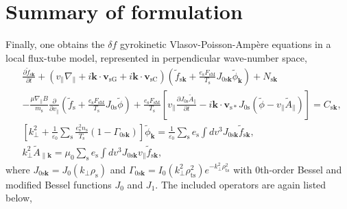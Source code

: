 \section{Summary of formulation}
\label{sec:Summary of formulation}
Finally, one obtains the $\delta f$ gyrokinetic Vlasov-Poisson-Amp\`{e}re equations in a local flux-tube model, represented in perpendicular wave-number space,
\begin{align}
  &\frac{\partial \tilde{f}_{\mathrm{s}\bm{k}}}{\partial t} + \left( v_\parallel \nabla_\parallel + i \bm{k} \cdot \bm{v}_\mathrm{sG} + i \bm{k} \cdot \bm{v}_\mathrm{sC} \right) \left( \tilde{f}_{\mathrm{s}\bm{k}} + \frac{e_\mathrm{s} F_\mathrm{sM}}{T_\mathrm{s}} J_{0\mathrm{s}\bm{k}} \tilde{\phi}_{\bm{k}} \right) + N_{\mathrm{s}\bm{k}} \nonumber \\
  &- \frac{\mu \nabla_\parallel B}{m_\mathrm{s}} \frac{\partial}{\partial v_\parallel} \left( \tilde{f}_\mathrm{s} + \frac{e_\mathrm{s} F_\mathrm{sM}}{T_\mathrm{s}} J_{0\mathrm{s}} \tilde{\phi} \right) + \frac{e_\mathrm{s} F_\mathrm{sM}}{T_\mathrm{s}} \left[ v_\parallel \frac{\partial J_{0\mathrm{s}} \tilde{A}_\parallel}{\partial t} - i \bm{k} \cdot \bm{v}_{\mathrm{s}*} J_{0\mathrm{s}} (\tilde{\phi} - v_\parallel \tilde{A}_\parallel) \right] = C_{\mathrm{s}\bm{k}}, 
  \label{eq:vlasovink}\\
  &\left[ k_\perp^2 + \frac{1}{\varepsilon_0} \sum_\mathrm{s} \frac{e_\mathrm{s}^2 n_\mathrm{s}}{T_\mathrm{s}} \left( 1 - \Gamma_{0\mathrm{s}\bm{k}} \right) \right] \tilde{\phi}_{\bm{k}} = \frac{1}{\varepsilon_0} \sum_\mathrm{s} e_\mathrm{s} \int dv^3 J_{0\mathrm{s}\bm{k}} \tilde{f}_{\mathrm{s}\bm{k}},
  \label{eq:poissonink} \\
  &k_\perp^2 \tilde{A}_{\parallel\bm{k}} = \mu_0 \sum_\mathrm{s} e_\mathrm{s} \int dv^3 J_{0\mathrm{s}\bm{k}} v_\parallel \tilde{f}_{\mathrm{s}\bm{k}},
  \label{eq:ampereink}
\end{align}
where $J_{0\mathrm{s}\bm{k}}=J_0(k_\perp \rho_{\mathrm{s}})$ and $\Gamma_{0\mathrm{s}\bm{k}}=I_0(k_\perp^2 \rho_{\mathrm{ts}}^2)e^{-k_\perp^2 \rho_{\mathrm{ts}}^2}$ with 0th-order Bessel and modified Bessel functions $J_0$ and $J_1$. The included operators are again listed below,

